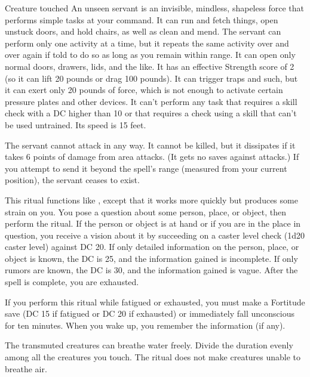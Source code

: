 \begin{spelltarget}{Creature touched}
\spelldur{\durlong \dismissable}
\spelleffect An unseen servant is an invisible, mindless, shapeless force that performs simple tasks at your command. It can run and fetch things, open unstuck doors, and hold chairs, as well as clean and mend. The servant can perform only one activity at a time, but it repeats the same activity over and over again if told to do so as long as you remain within range. It can open only normal doors, drawers, lids, and the like. It has an effective Strength score of 2 (so it can lift 20 pounds or drag 100 pounds). It can trigger traps and such, but it can exert only 20 pounds of force, which is not enough to activate certain pressure plates and other devices. It can't perform any task that requires a skill check with a DC higher than 10 or that requires a check using a skill that can't be used untrained. Its speed is 15 feet.
\par The servant cannot attack in any way. It cannot be killed, but it dissipates if it takes 6 points of damage from area attacks. (It gets no saves against attacks.) If you attempt to send it beyond the spell's range (measured from your current position), the servant ceases to exist.

\spelleffect This ritual functions like , except that it works more quickly but produces some strain on you. You pose a question about some person, place, or object, then perform the ritual. If the person or object is at hand or if you are in the place in question, you receive a vision about it by succeeding on a caster level check (1d20 \add caster level) against DC 20. If only detailed information on the person, place, or object is known, the DC is 25, and the information gained is incomplete. If only rumors are known, the DC is 30, and the information gained is vague. After the spell is complete, you are exhausted.
\par If you perform this ritual while fatigued or exhausted, you must make a Fortitude save (DC 15 if fatigued or DC 20 if exhausted) or immediately fall unconscious for ten minutes. When you wake up, you remember the information (if any).

\spelleffect The transmuted creatures can breathe water freely. Divide the duration evenly among all the creatures you touch.
\spellnotes The ritual does not make creatures unable to breathe air.


\end{spelltarget}

